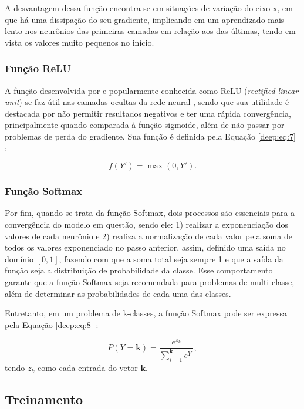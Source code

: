 A desvantagem dessa função encontra-se em situações de variação do eixo x, em que há uma  dissipação do seu gradiente, implicando em um aprendizado mais lento nos neurônios das primeiras camadas em relação aos das últimas, tendo em vista os valores muito pequenos no início.

\subsubsection{Função ReLU}
A função desenvolvida por \cite{Hahnioser2000} e popularmente conhecida como ReLU (\textit{rectified linear unit}) se faz útil nas camadas ocultas da rede neural \cite{Goodfellow2016}, sendo que sua utilidade é destacada por não permitir resultados negativos \cite{Dahl2013} e ter uma rápida convergência, principalmente quando comparada à função sigmoide, além de não passar por problemas de perda do gradiente. Sua função é definida pela Equação \ref{deep:eq:7} \cite{Hahnioser2000}:

\begin{equation}
    \label{deep:eq:7}
    f(Y') = \max(0,Y').
\end{equation}

\subsubsection{Função Softmax}
\label{deep:soft}
Por fim, quando se trata da função Softmax, dois processos são essenciais para a convergência do modelo em questão, sendo ele: 1) realizar a exponenciação dos valores de cada neurônio e 2) realiza a normalização de cada valor pela soma de todos os valores exponenciado no passo anterior, assim, definido uma saída no domínio $[0,1]$, fazendo com que a soma total seja sempre 1 \cite{kotu2018data} e que a saída da função seja a distribuição de probabilidade da classe. Esse comportamento garante que a função Softmax seja recomendada para problemas de multi-classe, além de determinar as probabilidades de cada uma das classes.

Entretanto, em um problema de k-classes, a função Softmax pode ser expressa pela Equação \ref{deep:eq:8} \cite{kotu2018data}:

\begin{equation}
    \label{deep:eq:8}
    P(Y = \boldsymbol{k}) = \frac{e^{z_k}}{\sum_{i=1}^{\boldsymbol{k}} e^{Y'}},
\end{equation}
tendo $z_k$ como cada entrada do vetor $\boldsymbol{k}$.


\subsection{Treinamento}
\label{deep:train}

